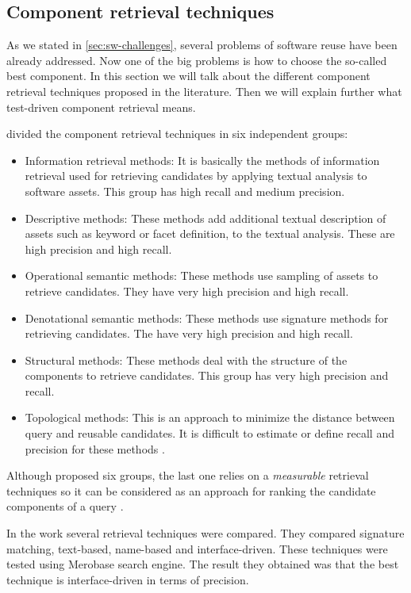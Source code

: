 \subsection{Component retrieval techniques}
As we stated in \ref{sec:sw-challenges}, several problems of software reuse have been already addressed. Now one of the big problems is how to choose the so-called best component. In this section we will talk about the different component retrieval techniques proposed in the literature. Then we will explain further what test-driven component retrieval means.

\cite{Mili1998} divided the component retrieval techniques in six independent groups:

\begin{itemize}
\item Information retrieval methods: It is basically the methods of information retrieval used for retrieving candidates by applying textual analysis to software assets. This group has high recall and medium precision.
\item Descriptive methods: These methods add additional textual description of assets such as keyword or facet definition, to the textual analysis. These are high precision and high recall.
\item Operational semantic methods: These methods use sampling of assets to retrieve candidates. They have very high precision and high recall.
\item Denotational semantic methods: These methods use signature methods for retrieving candidates. The have very high precision and high recall.
\item Structural methods: These methods deal with the structure of the components to retrieve candidates. This group has very high precision and recall.
\item Topological methods: This is an approach to minimize the distance between query and reusable candidates. It is difficult to estimate or define recall and precision for these methods \cite{Mili1998}.
\end{itemize}

Although \cite{Mili1998} proposed six groups, the last one relies on a \textit{measurable} retrieval techniques so it can be considered as an approach for ranking the candidate components of a query \cite{Hummel2007}.

In the work \cite{Hummel2007} several retrieval techniques were compared. They compared signature matching, text-based, name-based and interface-driven. These techniques were tested using Merobase search engine. The result they obtained was that the best technique is interface-driven in terms of precision.

